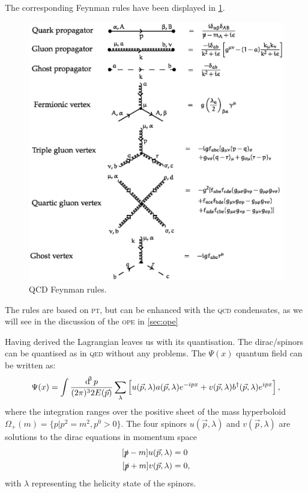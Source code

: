 \documentclass[../../index.tex]{subfiles}
\begin{document}
The corresponding Feynman rules have been displayed in
\cref{fig:qcdFeynmanRules}.
\begin{figure}
  \includegraphics[width=\textwidth]{./images/qcdFeynmanRules.eps}
  \caption{QCD Feynman rules.}
  \label{fig:qcdFeynmanRules}
\end{figure}
The rules are based on \textsc{pt}, but can be enhanced with the \textsc{qcd}
condensates, as we will see in the discussion of the \textsc{ope} in
\cref{sec:ope}

Having derived the Lagrangian leaves us with its quantisation. The
dirac\-/spinors can be quantised as in \textsc{qed} without any problems. The
\(\Psi(x)\) quantum field can be written as:
\begin{equation}
  \Psi(x) = \int \frac{\dif^3 p}{(2\pi)^3 2E(\vec p)} \sum_\lambda \left[ u(\vec p, \lambda) a(\vec p, \lambda) e^{-ipx} + v(\vec p, \lambda) b^\dagger (\vec p, \lambda) e^{ipx} \right],
\end{equation}
where the integration ranges over the positive sheet of the mass hyperboloid
\(\Omega_+(m) = \{p \vert p^2 = m^2, p^0 > 0 \}\). The four spinors \(u(\vec p,
\lambda)\) and \(v(\vec p, \lambda)\) are solutions to the dirac equations in
momentum space
\begin{equation}
  \begin{split}
    [\slashed p - m]u(\vec p, \lambda) &= 0 \\
    [\slashed p + m]v(\vec p, \lambda) &= 0,
  \end{split}
\end{equation}
with \(\lambda\) representing the helicity state of the spinors.
\end{document}
